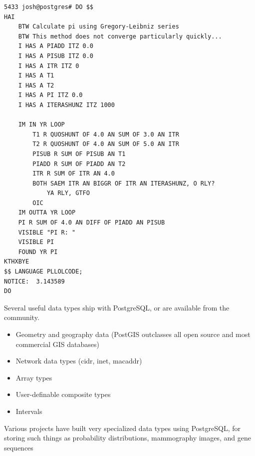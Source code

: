 \documentclass[svgnames]{beamer}
\begin{document}
\begin{frame}[fragile]
\tiny
\begin{verbatim}
5433 josh@postgres# DO $$
HAI
    BTW Calculate pi using Gregory-Leibniz series
    BTW This method does not converge particularly quickly...
    I HAS A PIADD ITZ 0.0
    I HAS A PISUB ITZ 0.0
    I HAS A ITR ITZ 0
    I HAS A T1
    I HAS A T2
    I HAS A PI ITZ 0.0
    I HAS A ITERASHUNZ ITZ 1000

    IM IN YR LOOP
        T1 R QUOSHUNT OF 4.0 AN SUM OF 3.0 AN ITR
        T2 R QUOSHUNT OF 4.0 AN SUM OF 5.0 AN ITR
        PISUB R SUM OF PISUB AN T1
        PIADD R SUM OF PIADD AN T2
        ITR R SUM OF ITR AN 4.0
        BOTH SAEM ITR AN BIGGR OF ITR AN ITERASHUNZ, O RLY?
            YA RLY, GTFO
        OIC
    IM OUTTA YR LOOP
    PI R SUM OF 4.0 AN DIFF OF PIADD AN PISUB
    VISIBLE "PI R: "
    VISIBLE PI
    FOUND YR PI
KTHXBYE
$$ LANGUAGE PLLOLCODE;
NOTICE:  3.143589
DO
\end{verbatim}
\end{frame}

\begin{frame}
Several useful data types ship with PostgreSQL, or are available from the community.
\begin{itemize}
    \item Geometry and geography data (PostGIS outclasses all open source and most commercial GIS databases)
    \item Network data types (cidr, inet, macaddr)
    \item Array types
    \item User-definable composite types
    \item Intervals
\end{itemize}
Various projects have built very specialized data types using PostgreSQL, for storing such things as probability distributions, mammography images, and gene sequences
\end{frame}

\end{document}

